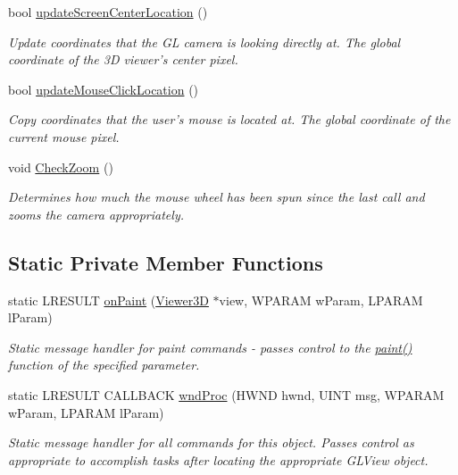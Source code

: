 \begin{DoxyCompactItemize}
bool \hyperlink{class_viewer3_d_a83f988410cad2c6e7f86f36286fb4988}{updateScreenCenterLocation} ()
\begin{DoxyCompactList}\small\item\em Update coordinates that the GL camera is looking directly at. The global coordinate of the 3D viewer's center pixel. \end{DoxyCompactList}\item 
bool \hyperlink{class_viewer3_d_a1068e916291ea9518d341c62318b479c}{updateMouseClickLocation} ()
\begin{DoxyCompactList}\small\item\em Copy coordinates that the user's mouse is located at. The global coordinate of the current mouse pixel. \end{DoxyCompactList}\item 
void \hyperlink{class_viewer3_d_ae131e5bc809ee80e6a32f9645f873fce}{CheckZoom} ()
\begin{DoxyCompactList}\small\item\em Determines how much the mouse wheel has been spun since the last call and zooms the camera appropriately. \end{DoxyCompactList}\end{DoxyCompactItemize}
\subsection*{Static Private Member Functions}
\begin{DoxyCompactItemize}
\item 
static LRESULT \hyperlink{class_viewer3_d_a19bfda5c1facd8a0908cb479ee683ed5}{onPaint} (\hyperlink{class_viewer3_d}{Viewer3D} $\ast$view, WPARAM wParam, LPARAM lParam)
\begin{DoxyCompactList}\small\item\em Static message handler for paint commands -\/ passes control to the \hyperlink{class_viewer3_d_a12869c54575f354e074d2a877ea53eb0}{paint()} function of the specified parameter. \end{DoxyCompactList}\item 
static LRESULT CALLBACK \hyperlink{class_viewer3_d_a40634d4bc466d20299a5e8b2f3f50ce4}{wndProc} (HWND hwnd, UINT msg, WPARAM wParam, LPARAM lParam)
\begin{DoxyCompactList}\small\item\em Static message handler for all commands for this object. Passes control as appropriate to accomplish tasks after locating the appropriate GLView object. \end{DoxyCompactList}\end{DoxyCompactItemize}
